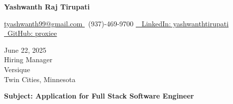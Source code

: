 \documentclass[letterpaper,11pt]{article}
\begin{document}
\begin{center}
    \textbf{\LARGE Yashwanth Raj Tirupati}
    \vspace{4pt}
    
    \small
    \href{mailto:tyashwanth99@gmail.com}{ tyashwanth99@gmail.com }\textbar
     ~(937)-469-9700 \textbar
    \href{https://linkedin.com/in/yashwanthtirupati}{~ LinkedIn: yashwanthtirupati }\textbar 
    \href{https://github.com/proxiee}{~GitHub: proxiee }
\end{center}

\vspace{20pt}

\begin{flushleft}
    June 22, 2025 \\
    \vspace{12pt}
    Hiring Manager \\
    Versique \\
    Twin Cities, Minnesota \\
\end{flushleft}


\begin{flushleft}
\textbf{Subject: Application for Full Stack Software Engineer}
\end{flushleft}


\end{document}

